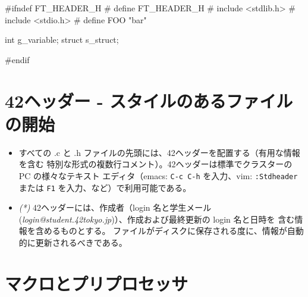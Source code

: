\documentclass{42-ja}
\begin{document}
\vspace{1cm}

        \begin{42ccode}
#ifndef FT_HEADER_H
# define FT_HEADER_H
# include <stdlib.h>
# include <stdio.h>
# define FOO "bar"

int     g_variable;
struct  s_struct;

#endif
        \end{42ccode}
        \newpage



   \section{42ヘッダー - スタイルのあるファイルの開始}

        \begin{itemize}

        \item すべての .c と .h ファイルの先頭には、42ヘッダーを配置する（有用な情報を含む
          特別な形式の複数行コメント）。42ヘッダーは標準でクラスターの PC の様々なテキスト
          エディタ（emacs: \texttt{C-c C-h} を入力、vim: \texttt{:Stdheader} または 
          \texttt{F1} を入力、など）で利用可能である。

        \item \textit{(*)} 42ヘッダーには、作成者（login 名と学生メール 
          (\textit{login@student.42tokyo.jp})）、作成および最終更新の login 名と日時を
          含む情報を含めるものとする。
          ファイルがディスクに保存される度に、情報が自動的に更新されるべきである。

        \end{itemize}

        \newpage


    \section{マクロとプリプロセッサ}
\end{document}
